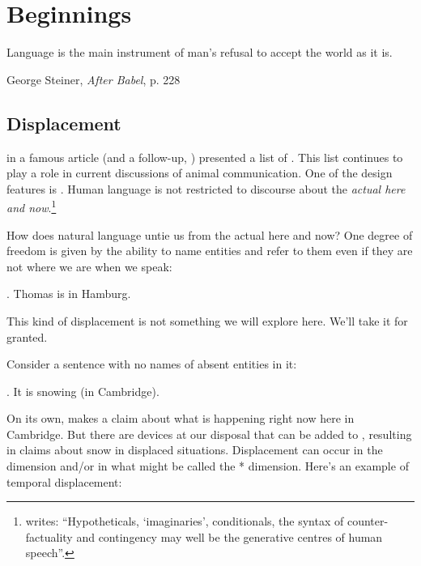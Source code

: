 \chapter{Beginnings}\label{cha:beginnings_of_intensional_semantics} %

\epigraph{Language is the main instrument of man's refusal to accept the world as it is.}{George Steiner, \emph{After Babel}, p. 228}


\minitoc

\section{Displacement} \label{sec:displacement}

\citet{hockett:origin:60} in a famous article (and a follow-up, \citet{hockett:design:68}) presented a list of . This list continues to play a role in current discussions of animal communication. One of the design features is . Human language is not restricted to discourse about the \emph{actual here and now}.\footnote{\citet[226]{steiner:1998:babel} writes: ``Hypotheticals, `imaginaries', conditionals, the syntax of counter-factuality and contingency may well be the generative centres of human speech''.}

How does natural language untie us from the actual here and now? One degree of freedom is given by the ability to name entities and refer to them even if they are not where we are when we speak:

\ex. Thomas is in Hamburg.

This kind of displacement is not something we will explore here. We'll take it for granted.

Consider a sentence with no names of absent entities in it:

\ex. It is snowing (in Cambridge).

On its own, \Last makes a claim about what is happening right now here in Cambridge. But there are devices at our disposal that can be added to \Last, resulting in claims about snow in displaced situations. Displacement can occur in the  dimension and/or in what might be called the * dimension. Here's an example of temporal displacement:

